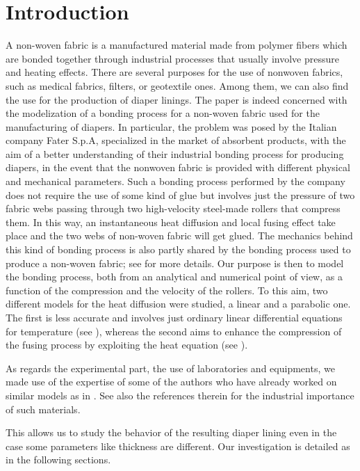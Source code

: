 \section{Introduction}
A non-woven fabric is a manufactured material made from polymer fibers which are bonded together through industrial processes that usually involve pressure and heating effects. There are several purposes for the use of nonwoven fabrics, such as medical fabrics, filters, or geotextile ones. Among them, we can also find the use for the production of diaper linings. The paper is indeed concerned with the modelization of a bonding process for a non-woven fabric used for the manufacturing of diapers. In particular, the problem was posed by the Italian company Fater S.p.A, specialized in the market of absorbent products, with the aim of a better understanding of their industrial bonding process for producing diapers, in the event that the nonwoven fabric is provided with different physical and mechanical parameters. Such a bonding process performed by the company does not require the use of some kind of glue but involves just the pressure of two fabric webs passing through two high-velocity steel-made rollers that compress them. In this way, an instantaneous heat diffusion and local fusing effect take place and the two webs of non-woven fabric will get glued. The mechanics behind this kind of bonding process is also partly shared by the bonding process used to produce a non-woven fabric; see \cite{Patent1, Patent2} for more details. Our purpose is then to model the bonding process, both from an analytical and numerical point of view, as a function of the compression and the velocity of the rollers. To this aim, two different models for the heat diffusion were studied, a linear and a parabolic one. The first is less accurate and involves just ordinary linear differential equations for temperature (see \cite{Cengel}), whereas the second aims to enhance the compression of the fusing process by exploiting the heat equation (see \cite{Formaggia}).
\par
As regards the experimental part, the use of laboratories and equipments, we made use of the expertise of some of the authors who have already worked on similar models as in \cite{Pegoretti}. See also the references therein for the industrial importance of such materials.
\par
This allows us to study the behavior of the resulting diaper lining even in the case some parameters like thickness are different. Our investigation is detailed as in the following sections.
